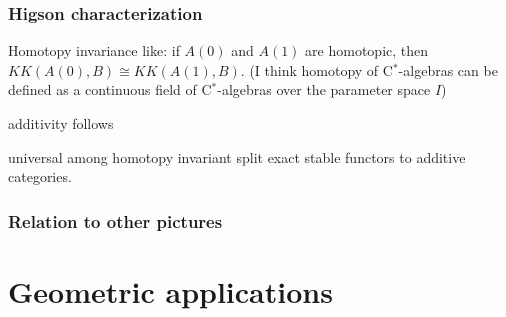 \documentclass{../../large}
\begin{document}
\begin{prb}
\end{prb}


\section{Higson characterization}



\begin{prb}[Continuity]
\end{prb}

\begin{prb}


Homotopy invariance like:
if $A(0)$ and $A(1)$ are homotopic, then $KK(A(0),B)\cong KK(A(1),B)$.
(I think homotopy of C$^*$-algebras can be defined as a continuous field of C$^*$-algebras over the parameter space $I$)

\end{prb}


\begin{prb}
additivity follows
\end{prb}

\begin{prb}[Stability]
\end{prb}


\begin{prb}
universal among homotopy invariant split exact stable functors to additive categories.
\end{prb}


\section{Relation to other pictures}
\begin{prb}
\end{prb}
\begin{prb}
\end{prb}













\part{Geometric applications}
\end{document}
